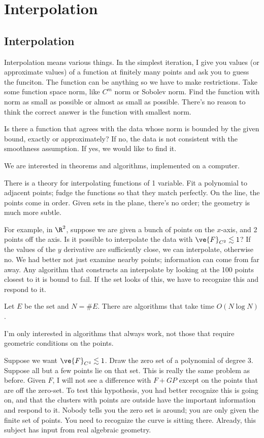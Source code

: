 \chapter{Interpolation}
\section{Interpolation}

Interpolation means various things. In the simplest iteration, I give you values (or approximate values) of a function at finitely many points  and ask you  to guess the funciton. The function can be anything so we have to make restrictions. Take some function space norm, like $C^m$ norm or Sobolev norm. Find the function with norm as small as possible or almost as small as possible. There's no reason to think the correct answer is the function with smallest norm. 

Is there a function that agrees with the data whose norm is bounded by the given bound, exactly or approximately? 
If no, the data is not consistent with the  smoothness assumption.
If yes, we would like to find it.

We are interested in theorems and algorithms, implemented on a computer. 

There is a theory for interpolating functions of 1 variable. Fit a polynomial to adjacent points; fudge the functions so that they match perfectly. On the line, the points come in order. Given sets in the plane, there's no order; the geometry is much more subtle.

For example, in $\R^2$, 
suppose we are given a bunch of points on the $x$-axis, and 2 points off the axis. Is it possible to interpolate the data with $\ve{F}_{C^2}\lesssim 1$? If the values of the $y$ derivative are sufficiently close, we can interpolate, otherwise no. We had better not just examine nearby points; information can come from far away. Any algorithm that constructs an interpolate by looking at the 100 points closest to it is bound to fail. If the set looks of this, we have to recognize this and respond to it.

Let $E$ be the set and $N=\#E$.
There are algorithms that take time $O(N\log N)$. 

I'm only interested in algorithms that always work, not those that require geometric conditions on the points.

Suppose we want $\ve{F}_{C^4}\lesssim 1$. 
Draw the zero set of a polynomial of degree 3. Suppose all but a few points lie on that set. This is really the same problem as before. Given $F$, I will not see a difference with $F+GP$ except on the points that are off the zero-set. To test this hypothesis, you had better recognize this is going on, and that the clusters with points are outside have the important information and respond to it.
Nobody tells you the zero set is around; you are only given the finite set of points. You need to recognize the curve is sitting there. Already, this subject  has input from real algebraic geometry.

